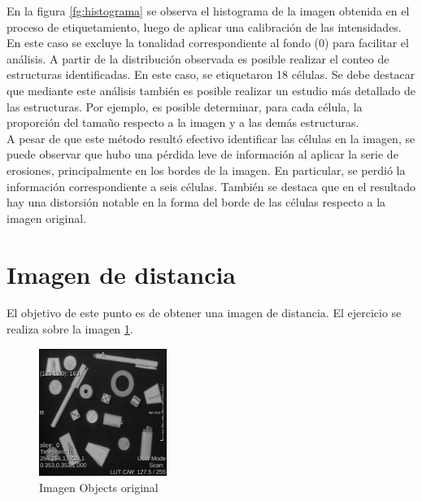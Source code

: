 \documentclass{article}
\begin{document}
En la figura \ref{fg:histograma} se observa el histograma de la imagen obtenida en el proceso de etiquetamiento, luego de aplicar una calibraci\'{o}n de las intensidades. En este caso se excluye la tonalidad correspondiente al fondo (0) para facilitar el an\'{a}lisis. A partir de la distribuci\'{o}n observada es posible realizar el conteo de estructuras identificadas. En este caso, se etiquetaron 18 c\'{e}lulas. Se debe destacar que mediante este an\'{a}lisis tambi\'{e}n es posible realizar un estudio m\'{a}s detallado de las estructuras. Por ejemplo, es posible determinar, para cada c\'{e}lula, la proporci\'{o}n del tama\~{u}o respecto a la imagen y a las dem\'{a}s estructuras.\\
A pesar de que este m\'{e}todo result\'{o} efectivo identificar las c\'{e}lulas en la imagen, se puede observar que hubo una p\'{e}rdida leve de informaci\'{o}n al aplicar la serie de erosiones, principalmente en los bordes de la imagen. En particular, se perdi\'{o} la informaci\'{o}n correspondiente a seis c\'{e}lulas. Tambi\'{e}n se destaca que en el resultado hay una distorsi\'{o}n notable en la forma del borde de las c\'{e}lulas respecto a la imagen original.




\section{Imagen de distancia}

\begin{par}
El objetivo de este punto es de obtener una imagen de distancia. El ejercicio se realiza sobre la imagen \ref{fg:2_orig}.
\end{par}

\begin{figure}[ht]
\begin{center}
\includegraphics[width=0.37\textwidth]{2Distancia/2_orig} %
\caption{Imagen Objects original}
\label{fg:2_orig}
\end{center}
\end{figure}
\FloatBarrier
\end{document}
